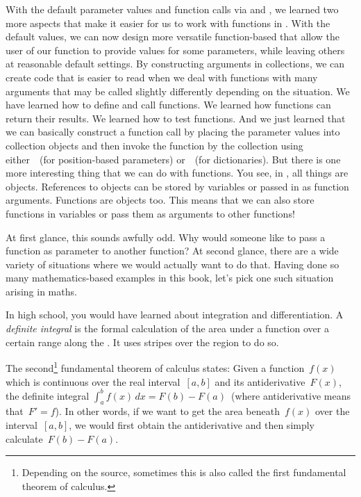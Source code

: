 With the default parameter values and function calls via \pythonil{*} and \pythonil{**}, we learned two more aspects that make it easier for us to work with functions in \python.
With the default values, we can now design more versatile function-based  that allow the user of our function to provide values for some parameters, while leaving others at reasonable default settings.
By constructing arguments in collections, we can create code that is easier to read when we deal with functions with many arguments that may be called slightly differently depending on the situation.%
\FloatBarrier%
\endhsection%
%
%
\label{sec:functionsAsVarsAndLambdas}%
%
We have learned how to define and call functions.
We learned how functions can return their results.
We learned how to test functions.
And we just learned that we can basically construct a function call by placing the parameter values into collection objects and then invoke the function by  the collection using either~\pythonil{*}~(for position-based parameters) or~\pythonil{**}~(for dictionaries).
But there is one more interesting thing that we can do with functions.
You see, in \python, all things are objects.
References to objects can be stored by variables or passed in as function arguments.
Functions are objects too.
This means that we can also store functions in variables or pass them as arguments to other functions!

At first glance, this sounds awfully odd.
Why would someone like to pass a function as parameter to another function?
At second glance, there are a wide variety of situations where we would actually want to do that.
Having done so many mathematics-based examples in this book, let's pick one such situation arising in maths.

In high school, you would have learned about integration and differentiation.
A \emph{definite integral} is the formal calculation of the area under a function over a certain range along the .
It uses  stripes over the region to do so.

The second\footnote{%
Depending on the source, sometimes this is also called the first fundamental theorem of calculus.%
} %
fundamental theorem of calculus states:
Given a function~$f(x)$ which is continuous over the real interval~$[a,b]$ and its antiderivative~$F(x)$, the definite integral $\int_a^b f(x)\,dx = F(b)-F(a)$~(where antiderivative means that~$F'=f$).
In other words, if we want to get the area beneath~$f(x)$ over the interval~$[a,b]$, we would first obtain the antiderivative and then simply calculate~$F(b)-F(a)$.

